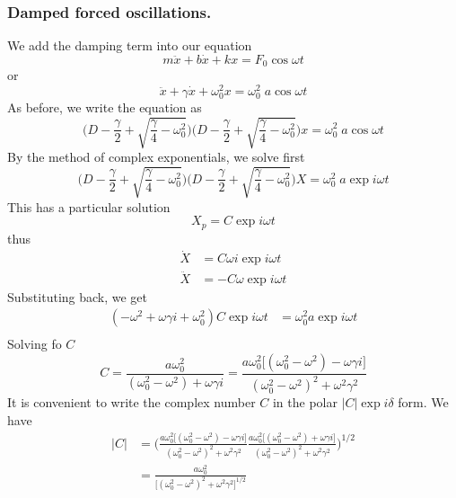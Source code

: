 \documentclass[../main.tex]{subfiles}
\begin{document}
\subsubsection*{Damped forced oscillations.} We add the damping term into our equation
\begin{equation*}
    m\ddot{x}+b\dot{x}+kx=F_0 \cos \omega t
\end{equation*}
or
\begin{equation*}
    \ddot{x}+\gamma\dot{x}+\omega_0^2x=\omega_0^2\;a \cos \omega t
\end{equation*}
As before, we write the equation as 
\begin{equation*}
    \biggl(D-\frac{\gamma}{2}+\sqrt{\frac{\gamma}{4}-\omega_0^2}\biggr)\biggl(D-\frac{\gamma}{2}+\sqrt{\frac{\gamma}{4}-\omega_0^2}\biggr)x=\omega_0^2\;a \cos \omega t
\end{equation*}
By the method of complex exponentials, we solve first
\begin{equation*}
    \biggl(D-\frac{\gamma}{2}+\sqrt{\frac{\gamma}{4}-\omega_0^2}\biggr)\biggl(D-\frac{\gamma}{2}+\sqrt{\frac{\gamma}{4}-\omega_0^2}\biggr)X=\omega_0^2\;a \exp i\omega t
\end{equation*}
This has a particular solution
\begin{equation*}
    X_p=C\exp i\omega t
\end{equation*}
thus 
\begin{align*}
    \dot{X}&=C\omega i \exp i\omega t\\
    \ddot{X}&=-C\omega \exp i\omega t
\end{align*}
Substituting back, we get
\begin{align*}
    (-\omega^2+\omega \gamma i+\omega_0^2)C\exp{i\omega t}&=\omega_0^2a\exp{i\omega t}\\
\end{align*}
Solving fo $C$
\begin{equation*}
    C=\frac{a\omega_0^2}{(\omega_0^2-\omega^2)+\omega\gamma i}= \frac{a\omega_0^2 \big[(\omega_0^2-\omega^2)-\omega\gamma i\big]}{(\omega_0^2- \omega^2)^2 +\omega^2\gamma^2 }
\end{equation*}
It is convenient to write the complex number $C$ in the polar $|C|\exp i \delta$ form. We have
\begin{align*}
    |C|&=\Biggl( \frac{a\omega_0^2 \big[(\omega_0^2-\omega^2)-\omega\gamma i\big]}{(\omega_0^2- \omega^2)^2 +\omega^2\gamma^2 } \frac{a\omega_0^2 \big[(\omega_0^2-\omega^2)+\omega\gamma i\big]}{(\omega_0^2- \omega^2)^2 +\omega^2\gamma^2 }\Biggr)^{1/2}\\
    &= \frac{a\omega_0^2 }{\big[(\omega_0^2- \omega^2)^2 +\omega^2\gamma^2\big]^{1/2} }
\end{align*}
\end{document}

